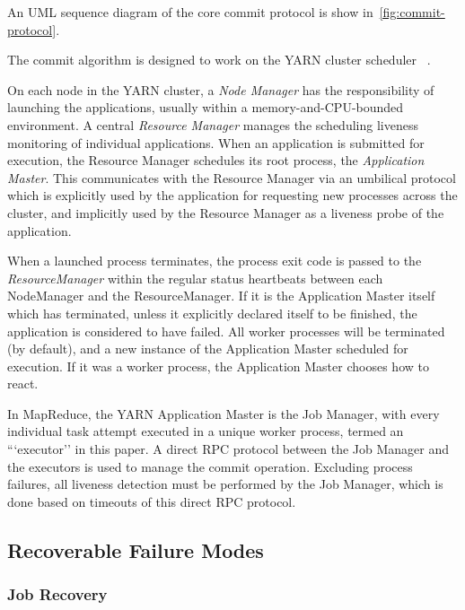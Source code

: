 \documentclass[format=acmsmall, screen=true, nonacm, timestamp, review=false]{acmart}
\begin{document}
An UML sequence diagram of the core commit protocol is
show in\ \ref{fig:commit-protocol}.

The commit algorithm is designed to work on the YARN cluster scheduler
\ \cite{Vavilapalli2013}.

On each node in the YARN cluster, a \emph{Node Manager} has the responsibility
of launching the applications, usually within a memory-and-CPU-bounded
environment.
A central \emph{Resource Manager} manages the scheduling liveness monitoring
of individual applications.
When an application is submitted for execution, the Resource Manager schedules
its root process, the \emph{Application Master}.
This communicates with the Resource Manager via an umbilical protocol
which is explicitly used by the application for requesting new processes
across the cluster, and implicitly used by the Resource Manager
as a liveness probe of the application.

When a launched process terminates, the process exit code
is passed to the \emph{ResourceManager} within the regular status heartbeats
between each NodeManager and the ResourceManager.
If it is the Application Master itself which has terminated, unless it explicitly
declared itself to be finished, the application is considered to have failed.
All worker processes will be terminated (by default), and a new instance
of the Application Master scheduled for execution.
If it was a worker process, the Application Master chooses how to    react.


In MapReduce, the YARN Application Master is the Job Manager,
with every individual task attempt executed in a unique worker process, termed
an ```executor'' in this paper.
A direct RPC protocol between the Job Manager and the executors is used to manage
the commit operation.
Excluding process failures, all liveness detection must be performed by the
Job Manager, which is done based on timeouts of this direct RPC protocol.


\subsection{Recoverable Failure Modes}
\label{subsec:optionalRecoverableFailureModes}

\subsubsection{Job Recovery}
\end{document}
